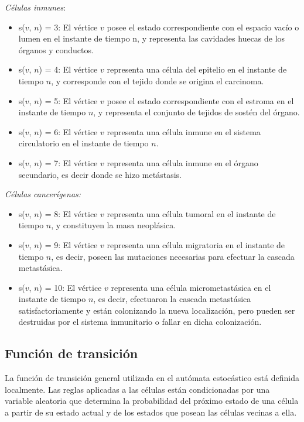 \documentclass[12pt]{amsart}
\begin{document}
{\it C\'elulas inmunes}: 
\begin{itemize}
\item s($v$, $n$) = 3: El v\'ertice $v$ posee el estado correspondiente con el espacio vac\'io o lumen en el instante de tiempo n, y representa las cavidades huecas de los \'organos y conductos.
\item s($v$, $n$) = 4: El v\'ertice $v$ representa una c\'elula del epitelio en el instante de tiempo $n$, y corresponde con el tejido donde se origina el carcinoma.
\item s($v$, $n$) = 5: El v\'ertice $v$ posee el estado correspondiente con el estroma en el instante de tiempo $n$, y representa el conjunto de tejidos de sost\'en del \'organo.
\item s($v$, $n$) = 6: El v\'ertice $v$ representa una c\'elula inmune en el sistema circulatorio en el instante de tiempo $n$.
\item s($v$, $n$) = 7: El v\'ertice $v$ representa una c\'elula inmune en el \'organo secundario, es decir donde se hizo met\'astasis.
\end{itemize}
{\it C\'elulas cancer\'igenas:} 
\begin{itemize}
\item s($v$, $n$) = 8: El v\'ertice $v$ representa una c\'elula tumoral en el instante de tiempo $n$, y constituyen la masa neopl\'asica.
\item s($v$, $n$) = 9: El v\'ertice $v$ representa una c\'elula migratoria en el instante de tiempo $n$, es decir, poseen las mutaciones necesarias para efectuar la cascada metast\'asica.
\item s($v$, $n$) = 10: El v\'ertice $v$ representa una c\'elula micrometast\'asica en el instante de tiempo $n$, es decir, efectuaron la cascada metast\'asica satisfactoriamente y est\'an colonizando la nueva localizaci\'on, pero pueden ser destruidas por el sistema inmunitario o fallar en dicha colonizaci\'on.

\end{itemize}



\subsection{Funci\'on de transici\'on}
La funci\'on de transici\'on general utilizada en el aut\'omata estoc\'astico est\'a definida localmente. Las reglas aplicadas a las c\'elulas est\'an condicionadas por una variable aleatoria que determina la probabilidad del pr\'oximo estado de una c\'elula a partir de su estado actual y de los estados que posean las c\'elulas vecinas a ella.
\label{subsec:funcion de transicion}
\end{document}
